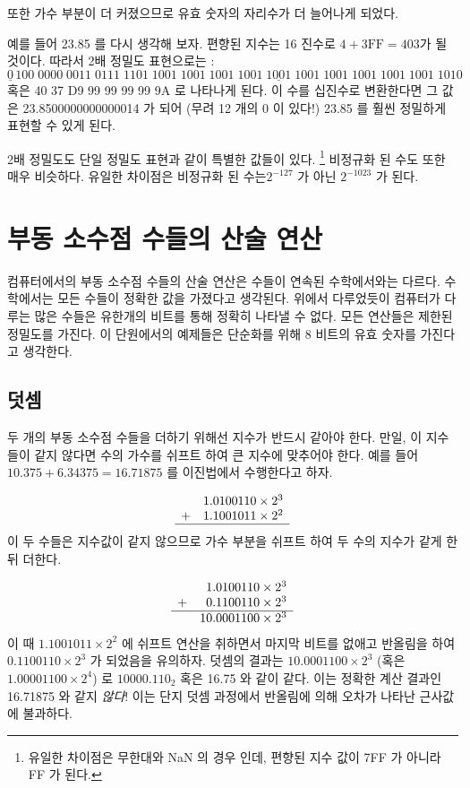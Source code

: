 또한 가수 부분이 더 커졌으므로 유효 숫자의 자리수가 더 늘어나게 되었다. 

예를 들어 23.85 를 다시 생각해 보자. 편향된 지수는 16 진수로 $4 + \mathrm{3FF} = 403$가
될 것이다. 따라서 2배 정밀도 표현으로는 :
\[ \underline{0}\,100\;0000\;0011\;\underline{0111\;1101\;1001\;1001\;1001\;
   1001\;1001\;1001\;1001\;1001\;1001\;1001\;1010} \]
혹은 40 37 D9 99 99 99 99 9A 로 나타나게 된다. 이 수를 십진수로 변환한다면 
그 값은 23.8500000000000014 가 되어 (무려 12 개의 0 이 있다!) 23.85 를 훨씬 정밀하게
표현할 수 있게 된다.

2배 정밀도도 단일 정밀도 표현과 같이 특별한 값들이 있다. 
\footnote{유일한 차이점은 무한대와 NaN 의 경우 인데, 편향된 지수 값이 7FF 가 아니라
FF 가 된다. }
비정규화 된 수도 또한 매우 비슷하다. 유일한 차이점은 비정규화 된 수는$2^{-127}$ 가 아닌 $2^{-1023}$ 
가 된다. 


\section{부동 소수점 수들의 산술 연산}

컴퓨터에서의 부동 소수점 수들의 산술 연산은 수들이 연속된 수학에서와는 다르다. 
수학에서는 모든 수들이 정확한 값을 가졌다고 생각된다. 위에서 다루었듯이 
컴퓨터가 다루는 많은 수들은 유한개의 비트를 통해 정확히 나타낼 수 없다. 모든 연산들은
제한된 정밀도를 가진다. 이 단원에서의 예제들은 단순화를 위해 8 비트의 유효 숫자를 가진다고
생각한다. 

\subsection{덧셈}
두 개의 부동 소수점 수들을 더하기 위해선 지수가 반드시 같아야 한다. 만일, 이 지수들이 같지 않다면
수의 가수를 쉬프트 하여 큰 지수에 맞추어야 한다. 예를 들어 $10.375 + 6.34375 = 16.71875$
를 이진법에서 수행한다고 하자. 

\[
\begin{array}{rr}
 & 1.0100110 \times 2^3 \\
+& 1.1001011 \times 2^2 \\ \hline
\end{array}
\]
이 두 수들은 지수값이 같지 않으므로 가수 부분을 쉬프트 하여 두 수의 지수가
같게 한 뒤 더한다.

\[
\begin{array}{rr@{.}l}
 &  1&0100110 \times 2^3 \\
+&  0&1100110 \times 2^3 \\ \hline
 & 10&0001100 \times 2^3
\end{array}
\]
이 때 $1.1001011 \times 2^2$ 에 쉬프트 연산을 취하면서 마지막 비트를 없애고
반올림을 하여 $0.1100110 \times 2^3$ 가 되었음을 유의하자. 덧셈의 결과는 
$10.0001100 \times 2^3$ (혹은 $1.00001100 \times 2^4$) 로 $10000.110_2$
혹은 16.75 와 같이 같다. 이는 정확한 계산 결과인 16.71875 와 같지 \emph{않다}! 이는 단지
덧셈 과정에서 반올림에 의해 오차가 나타난 근사값에 불과하다. 

